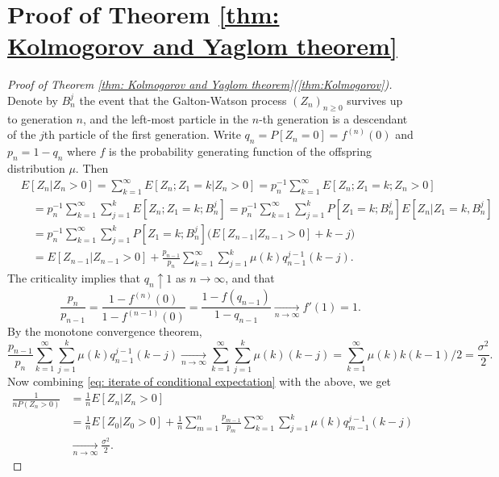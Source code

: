 \documentclass[UTF8]{pkuthss}
\theoremstyle{plain}
\theoremstyle{definition}
\numberwithin{equation}{section}
\begin{document}
\section{Proof of Theorem \ref{thm: Kolmogorov and Yaglom theorem}}
\label{sec: proofs}
\begin{proof}[Proof of Theorem \ref{thm: Kolmogorov and Yaglom theorem}(\ref{thm:Kolmogorov})]
	Denote by $B_n^j$ the event that the Galton-Watson process
	$(Z_n)_{n\geq 0}$
	survives up to generation $n$, and the left-most particle in the $n$-th generation is
	a descendant of the $j$th particle of the first generation.
	Write $q_n = P[Z_n = 0] = f^{(n)}(0)$ and $p_n = 1- q_n$ where $f$ is the probability generating function of the offspring distribution $\mu$.
	Then
	\begin{equation}
	\label{eq: iterate of conditional expectation}
	\begin{split}
	&E[Z_n| Z_n>0]
	= \sum_{k=1}^\infty E[Z_n; Z_1=k| Z_n>0]
	= p_n^{-1} \sum_{k=1}^\infty E[Z_n; Z_1=k;Z_{n}>0]
	\\&\quad = p_n^{-1} \sum_{k=1}^\infty \sum_{j=1}^k E[Z_n; Z_1=k;B_n^j]
	= p_n^{-1} \sum_{k=1}^\infty \sum_{j=1}^k P[Z_1=k;B_n^j] E[Z_n| Z_1=k,B_n^j]
	\\&\quad = p_n^{-1} \sum_{k=1}^\infty \sum_{j=1}^k P[Z_1=k;B_n^j] \Big( E[Z_{n-1}| Z_{n-1}>0] +k-j\Big)
	\\&\quad = E[Z_{n-1}|Z_{n-1}> 0]  + \frac{p_{n-1}}{p_n}\sum_{k=1}^\infty \sum_{j=1}^k \mu(k) q_{n-1}^{j-1}(k-j).
	\end{split}
	\end{equation}
	The criticality implies that $q_n \uparrow 1$ as $n \to \infty$, and that
	\[
	\frac{p_n}{p_{n-1}} = \frac{1- f^{(n)}(0)}{1-f^{(n-1)}(0)} = \frac{1- f(q_{n-1})}{1-q_{n-1}} \xrightarrow[n \to \infty]{} f'(1) = 1.
	\]
	By the monotone convergence theorem,
	\[
	\frac{p_{n-1}}{p_n} \sum_{k=1}^\infty \sum_{j=1}^k \mu(k) q_{n-1}^{j-1} (k-j)
	\xrightarrow[n \to \infty]{} \sum_{k=1}^\infty \sum_{j=1}^k \mu(k) (k-j)
	=  \sum_{k=1}^\infty \mu(k) k(k-1)/2
	= \frac{\sigma^2}{2}.
	\]
	Now combining \eqref{eq: iterate of conditional expectation} with the above, we get
	\[\begin{split}
	\frac{1}{n P(Z_n > 0)}
	&= \frac{1}{n} E[Z_n | Z_n > 0]
	\\&= \frac{1}{n}E[Z_0| Z_0 > 0] + \frac{1}{n} \sum_{m = 1}^n \frac{p_{m-1}}{p_m}\sum_{k=1}^\infty \sum_{j=1}^k \mu(k) q_{m-1}^{j-1}(k-j)
	\\& \xrightarrow[n \to \infty]{} \frac{\sigma^2}{2}.
	\end{split}\]
\end{proof}
\end{document}
